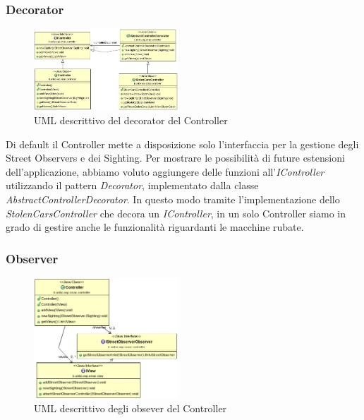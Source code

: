 \documentclass[a4paper,12pt]{report}
\begin{document}
    \subsubsection{Decorator}
      \begin{figure}
	\vspace{-40pt}
	\begin{center}
  \includegraphics[width=0.48\textwidth]{images/UMLcontroller}
	\caption{UML descrittivo del decorator del Controller}
	\label{fig:UMLcontrollerDecorator}
	\end{center}
	\vspace{-20pt}
      \end{figure}
      Di default il Controller mette a disposizione solo l'interfaccia per la 
gestione degli Street Observers e dei Sighting.\newline
      Per mostrare le possibilità di future estensioni dell'applicazione, 
abbiamo voluto aggiungere delle funzioni all'\textit{IController} utilizzando 
il pattern \textit{Decorator}, implementato dalla classe     
\textit{AbstractControllerDecorator}. 
    In questo modo tramite l'implementazione dello \textit{StolenCarsController} 
    che decora un \textit{IController}, in un solo Controller siamo in 
grado di gestire anche le funzionalità riguardanti le macchine rubate.

    
    \subsubsection{Observer}
    \begin{figure}
      \vspace{-40pt}
      \begin{center}
\includegraphics[width=0.48\textwidth]{images/UMLcontrollerObserver}
	\caption{UML descrittivo degli obsever del Controller}
	\label{fig:UMLcontrolerObserver}
      \end{center}
      \vspace{-10pt}
    \end{figure}
      
\end{document}
